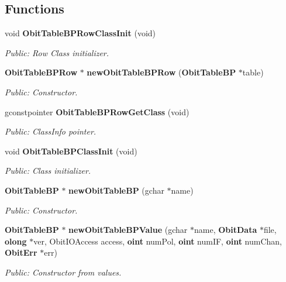 \subsection*{Functions}
\begin{CompactItemize}
\item 
void {\bf Obit\-Table\-BPRow\-Class\-Init} (void)
\begin{CompactList}\small\item\em Public: Row Class initializer. \item\end{CompactList}\item 
{\bf Obit\-Table\-BPRow} $\ast$ {\bf new\-Obit\-Table\-BPRow} ({\bf Obit\-Table\-BP} $\ast$table)
\begin{CompactList}\small\item\em Public: Constructor. \item\end{CompactList}\item 
gconstpointer {\bf Obit\-Table\-BPRow\-Get\-Class} (void)
\begin{CompactList}\small\item\em Public: Class\-Info pointer. \item\end{CompactList}\item 
void {\bf Obit\-Table\-BPClass\-Init} (void)
\begin{CompactList}\small\item\em Public: Class initializer. \item\end{CompactList}\item 
{\bf Obit\-Table\-BP} $\ast$ {\bf new\-Obit\-Table\-BP} (gchar $\ast$name)
\begin{CompactList}\small\item\em Public: Constructor. \item\end{CompactList}\item 
{\bf Obit\-Table\-BP} $\ast$ {\bf new\-Obit\-Table\-BPValue} (gchar $\ast$name, {\bf Obit\-Data} $\ast$file, {\bf olong} $\ast$ver, Obit\-IOAccess access, {\bf oint} num\-Pol, {\bf oint} num\-IF, {\bf oint} num\-Chan, {\bf Obit\-Err} $\ast$err)
\begin{CompactList}\small\item\em Public: Constructor from values. \item\end{CompactList}\item 

\end{CompactItemize}
